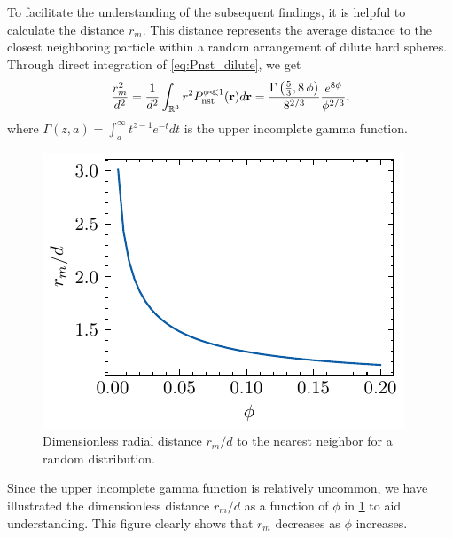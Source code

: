 \documentclass[11pt]{My_preprint}
\providecommand{\DIFaddbeginFL}{} %
\providecommand{\DIFaddendFL}{} %
\providecommand{\DIFdelbeginFL}{} %
\providecommand{\DIFdelendFL}{} %
\begin{document}
To facilitate the understanding of the subsequent findings, it is helpful to calculate the distance $r_m$. 
This distance represents the average distance to the closest neighboring particle within a random arrangement of dilute hard spheres. 
Through direct integration of \ref{eq:Pnst_dilute}, we get
\begin{align}
    \frac{r_m^2}{d^2}
    = 
\frac{1}{d^2}
    \int_{\mathbb{R}^3} r^2 P_\text{nst}^{\phi \ll 1}(\textbf{r}) d\textbf{r} 
    =  \frac{\Gamma\left({{5}\over{3}} , 8\,\phi\right)}{8^{2/3}}\frac{e^{8\phi}}{\phi^{2/3}},
\end{align}
where $\Gamma(z,a) = \int_a^\infty t^{z-1} e^{-t} dt$ is the upper incomplete gamma function.
\begin{figure}
  \centering
  \DIFdelbeginFL %
\DIFdelendFL \DIFaddbeginFL \includegraphics[height = 0.3\textwidth]{image/HOMOGENEOUS_final/PA/rm.pdf}
  \DIFaddendFL \caption{Dimensionless radial distance $r_m/d$ to the nearest neighbor for a random distribution.}
  \label{fig:agee}
\end{figure}
Since the upper incomplete gamma function is relatively uncommon, we have illustrated the dimensionless distance $r_m/d$ as a function of $\phi$ in \ref{fig:agee} to aid understanding. This figure clearly shows that $r_m$ decreases as $\phi$ increases.
\end{document}
